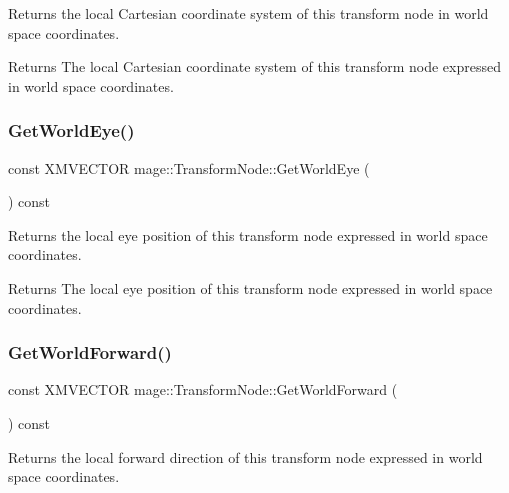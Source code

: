 Returns the local Cartesian coordinate system of this transform node in world space coordinates.

\begin{DoxyReturn}{Returns}
The local Cartesian coordinate system of this transform node expressed in world space coordinates. 
\end{DoxyReturn}
\hypertarget{structmage_1_1_transform_node_a413f7786329b48226572acde4174e484}{}\label{structmage_1_1_transform_node_a413f7786329b48226572acde4174e484} 
\subsubsection{\texorpdfstring{Get\+World\+Eye()}{GetWorldEye()}}
{\footnotesize\ttfamily const X\+M\+V\+E\+C\+T\+OR mage\+::\+Transform\+Node\+::\+Get\+World\+Eye (\begin{DoxyParamCaption}{ }\end{DoxyParamCaption}) const\hspace{0.3cm}{\ttfamily [noexcept]}}

Returns the local eye position of this transform node expressed in world space coordinates.

\begin{DoxyReturn}{Returns}
The local eye position of this transform node expressed in world space coordinates. 
\end{DoxyReturn}
\hypertarget{structmage_1_1_transform_node_a4737be175d69768d353f500636502296}{}\label{structmage_1_1_transform_node_a4737be175d69768d353f500636502296} 
\subsubsection{\texorpdfstring{Get\+World\+Forward()}{GetWorldForward()}}
{\footnotesize\ttfamily const X\+M\+V\+E\+C\+T\+OR mage\+::\+Transform\+Node\+::\+Get\+World\+Forward (\begin{DoxyParamCaption}{ }\end{DoxyParamCaption}) const\hspace{0.3cm}{\ttfamily [noexcept]}}

Returns the local forward direction of this transform node expressed in world space coordinates.

